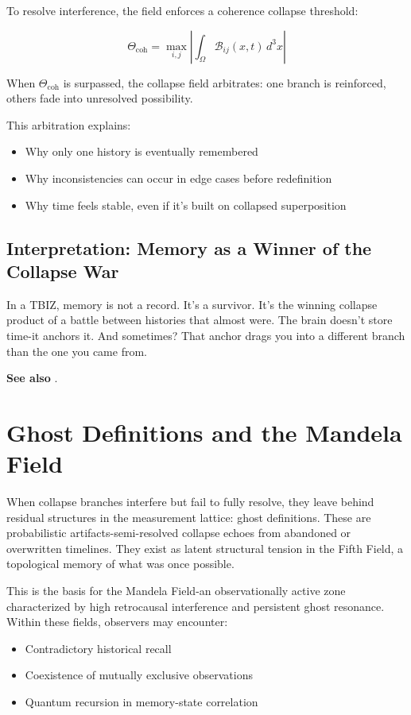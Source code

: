To resolve interference, the field enforces a coherence collapse threshold:

\begin{equation}
\Theta_{\text{coh}} = \max_{i,j} \left| \int_{\Omega} \mathcal{B}_{ij}(x,t) \, d^3x \right|
\end{equation}

When \( \Theta_{\text{coh}} \) is surpassed, the collapse field arbitrates: one branch is reinforced, others fade into unresolved possibility.

This arbitration explains:
\begin{itemize}
    \item Why only one history is eventually remembered
    \item Why inconsistencies can occur in edge cases before redefinition
    \item Why time feels stable, even if it’s built on collapsed superposition
\end{itemize}

\subsection{Interpretation: Memory as a Winner of the Collapse War}

In a TBIZ, memory is not a record. It’s a survivor. It’s the winning collapse product of a battle between histories that almost were. The brain doesn’t store time-it anchors it. And sometimes? That anchor drags you into a different branch than the one you came from.

\textbf{See also} \cite{chapter8_meta}.

\section{Ghost Definitions and the Mandela Field}

When collapse branches interfere but fail to fully resolve, they leave behind residual structures in the measurement lattice: ghost definitions. These are probabilistic artifacts-semi-resolved collapse echoes from abandoned or overwritten timelines. They exist as latent structural tension in the Fifth Field, a topological memory of what was once possible.

This is the basis for the Mandela Field-an observationally active zone characterized by high retrocausal interference and persistent ghost resonance. Within these fields, observers may encounter:
\begin{itemize}
    \item Contradictory historical recall
    \item Coexistence of mutually exclusive observations
    \item Quantum recursion in memory-state correlation
\end{itemize}

